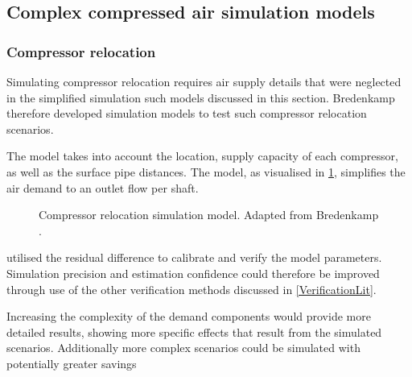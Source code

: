 \subsection{Complex compressed air simulation models} \label{simplfiedModels}
\subsubsection{Compressor relocation}
Simulating compressor relocation requires air supply details that were neglected in the simplified simulation such models discussed in this section. Bredenkamp \cite{Bredenkamp2013Masters} therefore developed simulation models to test such compressor relocation scenarios. 
\par
The model takes into account the location, supply capacity of each compressor, as well as the surface pipe distances. The model, as visualised in \cref{fig: bredenkamp model}, simplifies the air demand to an outlet flow per shaft.
\par
\begin{figure}[h!]
	\centering
	\caption[Compressor relocation simulation model.]{Compressor relocation simulation model. Adapted from Bredenkamp \cite{Bredenkamp2013Masters}.}
	\label{fig: bredenkamp model}
\end{figure} 
\cite{Bredenkamp2013Masters} utilised the residual difference to calibrate and verify the model parameters. Simulation precision and estimation confidence could therefore be improved through use of the other verification methods discussed in \cref{VerificationLit}.
\par 
Increasing the complexity of the demand components would provide more detailed results, showing more specific effects that result from the simulated scenarios. Additionally more complex scenarios could be simulated with potentially greater savings


